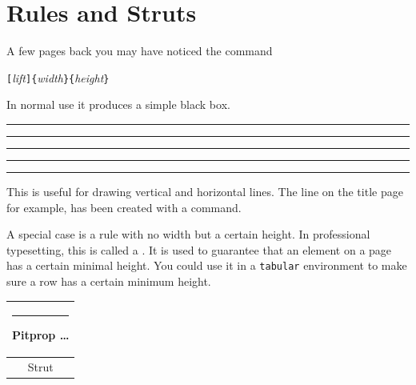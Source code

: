 \section{Rules and Struts}
\label{sec:rule}

A few pages back you may have noticed the command

\begin{command}
\verb|[|\emph{lift}\verb|]{|\emph{width}\verb|}{|\emph{height}\verb|}|
\end{command}

\noindent In normal use it produces a simple black box.

\begin{example}
\rule{3mm}{.1pt}%
\rule[-1mm]{5mm}{1cm}%
\rule{3mm}{.1pt}%
\rule[1mm]{1cm}{5mm}%
\rule{3mm}{.1pt}
\end{example}

\noindent This is useful for drawing vertical and horizontal
lines. The line on the title page for example, has been created with a
 command.

A special case is a rule with no width but a certain height. In
professional typesetting, this is called a . It is used to
guarantee that an element on a page has a certain minimal height. You
could use it in a \texttt{tabular} environment to make sure a row has
a certain minimum height.

\begin{example}
\begin{tabular}{|c|}
\hline
\rule{1pt}{4ex}Pitprop \ldots\\
\hline
\rule{0pt}{4ex}Strut\\
\hline
\end{tabular}
\end{example}


